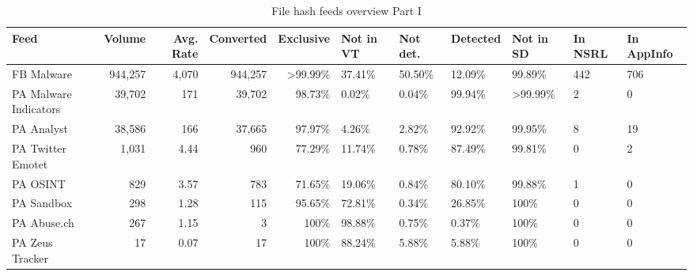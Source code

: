 \begin{table*}[htt]
\footnotesize \tabcolsep=0.11cm
\caption{File hash feeds overview Part I}
\centering
\small
\begin{tabular}{l | r r r r H H H H H H }
\toprule
 Feed         &   Volume  &  Avg. Rate  & Converted &   Exclusive  &   Not in VT    &  Not det.  &   Detected   &   Not in SD &   In NSRL   &  In AppInfo  \\
\midrule
 FB Malware              &    944,257  &  4,070    & 944,257   &    >99.99\%    &     37.41\%    &    50.50\%      &     12.09\%          &    99.89\% &     442 &             706 \\
 PA Malware Indicators   &    39,702   &  171      & 39,702    &     98.73\%    &      0.02\%    &     0.04\%      &     99.94\%          &   >99.99\% &       2 &             0  \\
 PA Analyst              &    38,586   &  166      & 37,665    &     97.97\%    &      4.26\%    &     2.82\%      &     92.92\%          &    99.95\% &       8 &             19 \\
 PA Twitter Emotet       &    1,031    &  4.44     & 960       &     77.29\%    &     11.74\%    &     0.78\%      &     87.49\%          &    99.81\% &       0 &             2  \\
 PA OSINT                &    829      &  3.57     & 783       &     71.65\%    &     19.06\%    &     0.84\%      &     80.10\%          &    99.88\% &       1 &             0  \\
 PA Sandbox              &    298      &  1.28     & 115       &     95.65\%    &     72.81\%    &     0.34\%      &     26.85\%          &    100\% &         0 &             0  \\
 PA Abuse.ch             &    267      &  1.15     & 3         &       100\%    &     98.88\%    &     0.75\%      &      0.37\%          &    100\% &         0 &             0  \\
 PA Zeus Tracker         &    17       &  0.07     & 17        &       100\%    &     88.24\%    &     5.88\%      &      5.88\%          &    100\% &         0 &             0  \\
\bottomrule
\end{tabular}
\label{tab:md5-volume-1}
\end{table*}


